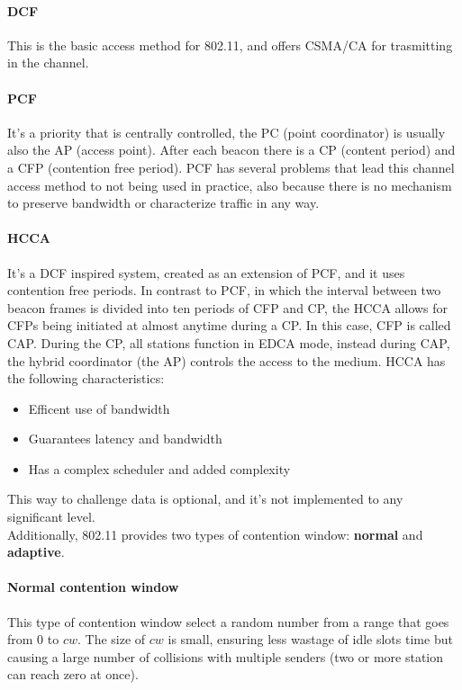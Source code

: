 \paragraph*{DCF} This is the basic access method for 802.11, and offers CSMA/CA for trasmitting in the channel.

\paragraph*{PCF} It's a priority that is centrally controlled, the PC (point coordinator) is usually also the AP (access point).
After each beacon there is a CP (content period) and a CFP (contention free period). PCF has several problems that lead this channel access method to not being used in practice, also because there is no mechanism to preserve bandwidth or characterize traffic in any way.

\paragraph*{HCCA} It's a DCF inspired system, created as an extension of PCF, and it uses contention free periods. In contrast to PCF, in which the interval between two beacon frames is divided into ten periods of CFP and CP, the HCCA allows for CFPs being initiated at almost anytime during a CP. In this case, CFP is called CAP. During the CP, all stations function in EDCA mode, instead during CAP, the hybrid coordinator (the AP) controls the access to the medium.
HCCA has the following characteristics:
\begin{itemize}
\item Efficent use of bandwidth
\item Guarantees latency and bandwidth
\item Has a complex scheduler and added complexity
\end{itemize}

This way to challenge data is optional, and it's not implemented to any significant level.\\[5pt]


Additionally, 802.11 provides two types of contention window: \textbf{normal} and
\textbf{adaptive}.

\paragraph*{Normal contention window} This type of contention window select a random number from a range that goes from 0 to $cw$. The size of $cw$ is small, ensuring less wastage of idle slots time but causing a large number of collisions with multiple senders (two or more station can reach zero at once).

